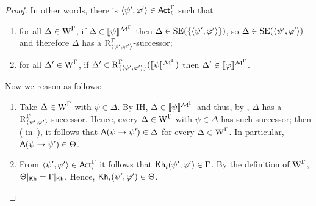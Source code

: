 \begin{proof}
In other words, there is $\langle \psi',\varphi' \rangle \in {\rm \sf Act}^\Gamma_i$ such that
\begin{enumerate}
    \item\label{tlm:cm-esmiv-stexec-lkhi-itm:i} for all $\Delta \in \operatorname{W}^\Gamma$, if $\Delta \in \llbracket \psi \rrbracket^{\mathcal{M}^\Gamma}$ then $\Delta \in \operatorname{SE}(\{ \langle \psi',\varphi' \rangle \})$, so $\Delta \in \operatorname{SE}(\langle \psi',\varphi' \rangle)$ and therefore $\Delta$ has a $\operatorname{R}^\Gamma_{\langle \psi',\varphi' \rangle}$-successor;
    \item\label{tlm:cm-esmiv-stexec-lkhi-itm:ii} for all $\Delta' \in \operatorname{W}^\Gamma$, if $\Delta' \in \operatorname{R}^\Gamma_{\{ \langle \psi',\varphi' \rangle \}}(\llbracket \psi \rrbracket^{\mathcal{M}^\Gamma})$ then $\Delta' \in \llbracket \varphi \rrbracket^{\mathcal{M}^\Gamma}$.
\end{enumerate}
Now we reason as follows:
\begin{enumerate}
    \item Take $\Delta \in \operatorname{W}^\Gamma$ with $\psi \in \Delta$. By IH, $\Delta \in \llbracket \psi \rrbracket^{\mathcal{M}^\Gamma}$ and thus, by , $\Delta$ has a $\operatorname{R}^\Gamma_{\langle \psi',\varphi' \rangle}$-successor. 
    Hence, every $\Delta \in \operatorname{W}^\Gamma$ with $\psi \in \Delta$ has such successor; then ( in~), it follows that ${\sf A}(\psi \rightarrow \psi') \in \Delta$ for every $\Delta \in \operatorname{W}^\Gamma$.
    In particular, ${\sf A}(\psi \rightarrow \psi') \in \Theta$.

    \item From $\langle \psi',\varphi' \rangle \in {\rm \sf Act}^\Gamma_i$ it follows that ${\sf Kh}_i(\psi',\varphi') \in \Gamma$.
    By the definition of $\operatorname{W}^\Gamma$, $\Theta\vert_{{\sf Kh}} = \Gamma\vert_{{\sf Kh}}$.
    Hence, ${\sf Kh}_i(\psi',\varphi') \in \Theta$.


\end{enumerate}
\end{proof}
